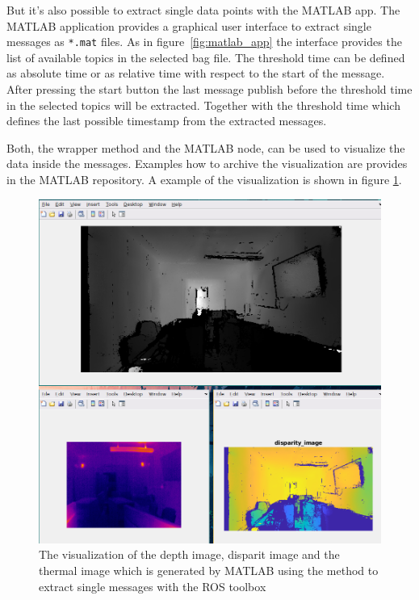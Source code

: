But it's also possible to extract single data points with the MATLAB app.
The MATLAB application provides a graphical user interface to extract single messages as \texttt{*.mat} files.
As in figure~\ref{fig:matlab_app} the interface provides the list of available topics in the selected bag file.
The threshold time can be defined as absolute time or as relative time with respect to the start of the message.
After pressing the start button the last message publish before the threshold time in the selected topics will be extracted.
Together with the threshold time which defines the last possible timestamp from the extracted messages.

Both, the wrapper method and the MATLAB node, can be used to visualize the data inside the messages.
Examples how to archive the visualization are provides in the MATLAB repository.
A example of the visualization is shown in figure \ref{fig:matlab_visualization}.

\begin{figure}[b]
    \centering
    \includegraphics[width=\textwidth]{img/results/maltab_visualization.png}
    \caption{The visualization of the depth image, disparit image and the thermal image which is generated by MATLAB using the method to extract single messages with the ROS toolbox}
    \label{fig:matlab_visualization}
\end{figure}



